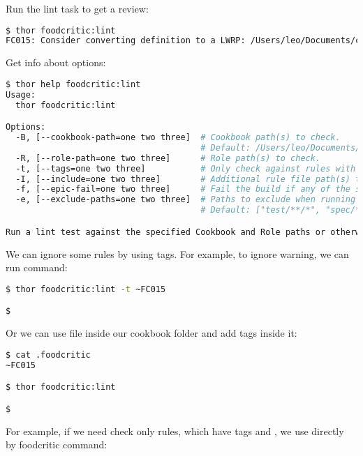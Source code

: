 Run the lint task to get a review:

\begin{lstlisting}[language=Bash,label=lst:testing-thor4]
$ thor foodcritic:lint
FC015: Consider converting definition to a LWRP: /Users/leo/Documents/chef_book/code/my-server-cloud/site-cookbooks/my_cool_app/definitions/enable_web_site.rb:1
\end{lstlisting}

Get info about options:

\begin{lstlisting}[language=Bash,label=lst:testing-thor5]
$ thor help foodcritic:lint
Usage:
  thor foodcritic:lint

Options:
  -B, [--cookbook-path=one two three]  # Cookbook path(s) to check.
                                       # Default: /Users/leo/Documents/chef_book/code/my-server-cloud/site-cookbooks/my_cool_app
  -R, [--role-path=one two three]      # Role path(s) to check.
  -t, [--tags=one two three]           # Only check against rules with the specified tags.
  -I, [--include=one two three]        # Additional rule file path(s) to load.
  -f, [--epic-fail=one two three]      # Fail the build if any of the specified tags are matched.
  -e, [--exclude-paths=one two three]  # Paths to exclude when running tests.
                                       # Default: ["test/**/*", "spec/**/*", "features/**/*"]

Run a lint test against the specified Cookbook and Role paths or otherwise your current working directory.
\end{lstlisting}

We can ignore some rules by using tags. For example, to ignore  warning, we can run command:

\begin{lstlisting}[language=Bash,label=lst:testing-thor6]
$ thor foodcritic:lint -t ~FC015

$
\end{lstlisting}

Or we can use  file inside our cookbook folder and add tags inside it:

\begin{lstlisting}[language=Bash,label=lst:testing-thor7]
$ cat .foodcritic
~FC015

$ thor foodcritic:lint

$
\end{lstlisting}

For example, if we need check only rules, which have tags  and , we use directly by foodcritic command:

